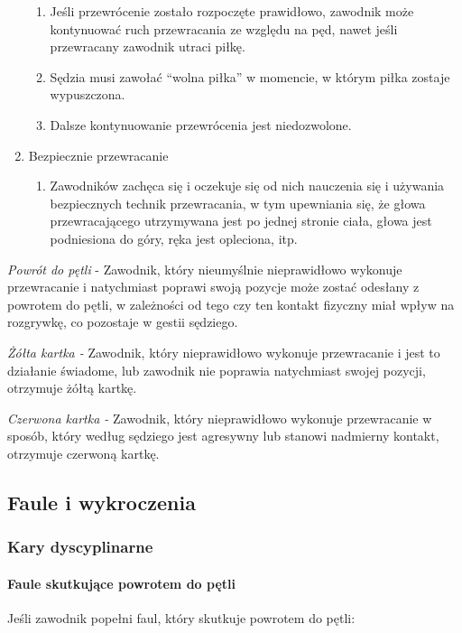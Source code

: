 \documentclass[12pt]{article}
\begin{document}
\begin{enumerate}
  \begin{enumerate}
  \item
        Jeśli przewrócenie zostało rozpoczęte prawidłowo, zawodnik może
    kontynuować ruch przewracania ze względu na pęd, nawet jeśli
    przewracany zawodnik utraci piłkę.
      \item
        Sędzia musi zawołać ``wolna piłka'' w momencie, w którym piłka
    zostaje wypuszczona.
      \item
        Dalsze kontynuowanie przewrócenia jest niedozwolone.
      \end{enumerate}
\item
    Bezpiecznie przewracanie
  
  \begin{enumerate}
  \item
        Zawodników zachęca się i oczekuje się od nich nauczenia się i
    używania bezpiecznych technik przewracania, w tym upewniania się, że
    głowa przewracającego utrzymywana jest po jednej stronie ciała,
    głowa jest podniesiona do góry, ręka jest opleciona, itp.
      \end{enumerate}
\end{enumerate}

\emph{Powrót do pętli} - Zawodnik, który nieumyślnie nieprawidłowo
wykonuje przewracanie i natychmiast poprawi swoją pozycje może zostać
odesłany z powrotem do pętli, w zależności od tego czy ten kontakt
fizyczny miał wpływ na rozgrywkę, co pozostaje w gestii sędziego.

\emph{Żółta kartka -} Zawodnik, który nieprawidłowo wykonuje
przewracanie i jest to działanie świadome, lub zawodnik nie poprawia
natychmiast swojej pozycji, otrzymuje żółtą kartkę.

\emph{Czerwona kartka -} Zawodnik, który nieprawidłowo wykonuje
przewracanie w sposób, który według sędziego jest agresywny lub stanowi
nadmierny kontakt, otrzymuje czerwoną kartkę.

\subsection{Faule i wykroczenia}

\subsubsection{Kary dyscyplinarne}

\paragraph{Faule skutkujące powrotem do pętli}
Jeśli zawodnik
popełni faul, który skutkuje powrotem do pętli:
\end{document}

